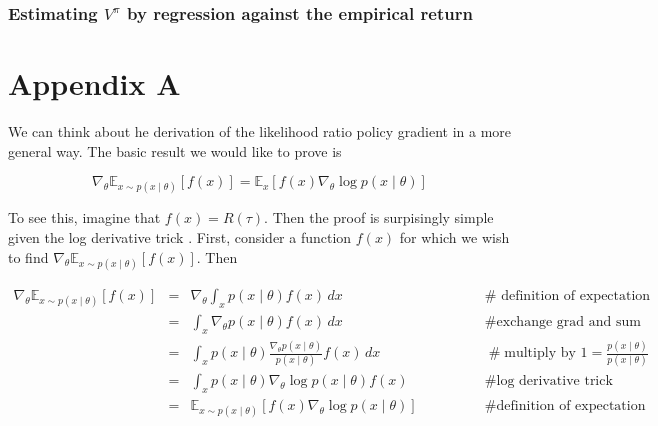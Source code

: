 \documentclass[11pt, oneside]{article}					%
\begin{document}
\subsubsection{Estimating $V^{\pi}$ by regression against the empirical return}

\newpage
\section{Appendix A}
\label{appendix:a}
We can think about he derivation of the likelihood ratio policy
gradient in a more general way. The basic result we would like to
prove is
 
\begin{equation*}
\nabla_{\theta} \mathbb{E}_{x \sim p(x \mid \theta)} [f(x)] 
		= \mathbb{E}_{x} [f(x) \nabla_{\theta} \log p(x  \mid  \theta)]
\end{equation*}

\bigskip
\noindent
To see this, imagine that $f(x) = R(\tau)$.
Then the proof is surpisingly simple given the log derivative
trick \cite{log_derivative_trick}. First, consider a function
$f(x)$ for which we wish to find $\nabla_{\theta} \mathbb{E}_{x
\sim p(x \mid \theta)} [f(x)]$. Then

%
%
\begin{equation*}
\begin{array}{llll}
\nabla_{\theta} \mathbb{E}_{x \sim p(x \mid \theta)} [f(x)] 
&=& {\displaystyle \nabla_{\theta} \int_x p(x \mid \theta) f(x) \, dx}  
		&\qquad \qquad \mathbin{\#} \text{ definition of expectation} \\
[15pt]
&=& {\displaystyle \int_x \nabla_{\theta} p(x \mid \theta) f(x) \, dx}
		&\qquad \qquad \mathrel{\#} \text{exchange grad and sum} \\
[15pt]
&=& {\displaystyle \int_x p(x \mid \theta) 
		\frac{\nabla_{\theta} p(x \mid \theta)} {p(x \mid \theta)} f(x) \, dx}  
		&\qquad \qquad \mathrel{\#} \text{multiply by } 1 = \frac{p(x \mid \theta)}{p(x \mid \theta)} \\
[15pt]
&=& {\displaystyle \int_x p(x \mid \theta)  \nabla_{\theta} \log{p(x \mid \theta)} f(x)} 
		&\qquad \qquad \mathrel{\#} \text{log derivative trick} \\
[15pt]
&=& \mathbb{E}_{x \sim p(x \mid \theta)} [f(x) \nabla_{\theta} \log{p(x \mid \theta)}] 
		&\qquad \qquad \mathrel{\#} \text{definition of expectation} 
\end{array}
\end{equation*}
\end{document}
